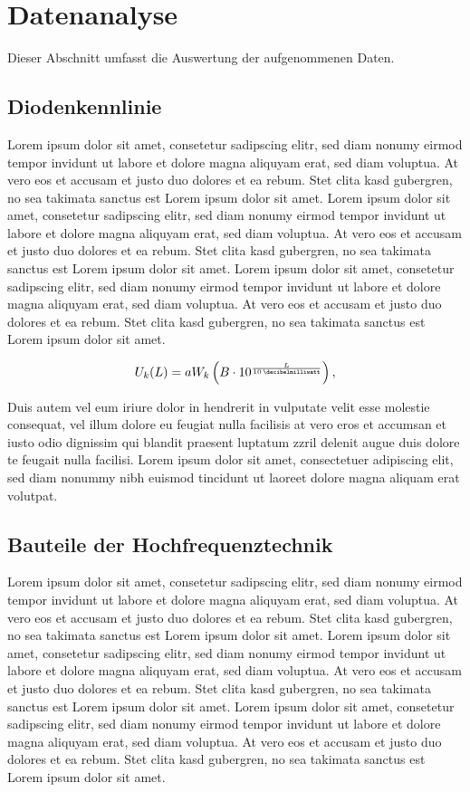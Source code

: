 \section{Datenanalyse}

	Dieser Abschnitt umfasst die Auswertung der aufgenommenen Daten.

\subsection{Diodenkennlinie}
	
	Lorem ipsum dolor sit amet, consetetur sadipscing elitr, sed diam nonumy eirmod tempor invidunt ut labore et dolore magna aliquyam erat, sed diam voluptua. At vero eos et accusam et justo duo dolores et ea rebum. Stet clita kasd gubergren, no sea takimata sanctus est Lorem ipsum dolor sit amet. Lorem ipsum dolor sit amet, consetetur sadipscing elitr, sed diam nonumy eirmod tempor invidunt ut labore et dolore magna aliquyam erat, sed diam voluptua. At vero eos et accusam et justo duo dolores et ea rebum. Stet clita kasd gubergren, no sea takimata sanctus est Lorem ipsum dolor sit amet. Lorem ipsum dolor sit amet, consetetur sadipscing elitr, sed diam nonumy eirmod tempor invidunt ut labore et dolore magna aliquyam erat, sed diam voluptua. At vero eos et accusam et justo duo dolores et ea rebum. Stet clita kasd gubergren, no sea takimata sanctus est Lorem ipsum dolor sit amet. 
	
	\begin{equation}
		U_k(L)=a W_k\left(B\cdot 10^{\frac{L}{\SI{10}{\decibelmilliwatt}}}\right),
	\end{equation}
	
	Duis autem vel eum iriure dolor in hendrerit in vulputate velit esse molestie consequat, vel illum dolore eu feugiat nulla facilisis at vero eros et accumsan et iusto odio dignissim qui blandit praesent luptatum zzril delenit augue duis dolore te feugait nulla facilisi. Lorem ipsum dolor sit amet, consectetuer adipiscing elit, sed diam nonummy nibh euismod tincidunt ut laoreet dolore magna aliquam erat volutpat. 

\subsection{Bauteile der Hochfrequenztechnik}

	Lorem ipsum dolor sit amet, consetetur sadipscing elitr, sed diam nonumy eirmod tempor invidunt ut labore et dolore magna aliquyam erat, sed diam voluptua. At vero eos et accusam et justo duo dolores et ea rebum. Stet clita kasd gubergren, no sea takimata sanctus est Lorem ipsum dolor sit amet. Lorem ipsum dolor sit amet, consetetur sadipscing elitr, sed diam nonumy eirmod tempor invidunt ut labore et dolore magna aliquyam erat, sed diam voluptua. At vero eos et accusam et justo duo dolores et ea rebum. Stet clita kasd gubergren, no sea takimata sanctus est Lorem ipsum dolor sit amet. Lorem ipsum dolor sit amet, consetetur sadipscing elitr, sed diam nonumy eirmod tempor invidunt ut labore et dolore magna aliquyam erat, sed diam voluptua. At vero eos et accusam et justo duo dolores et ea rebum. Stet clita kasd gubergren, no sea takimata sanctus est Lorem ipsum dolor sit amet. 
	
